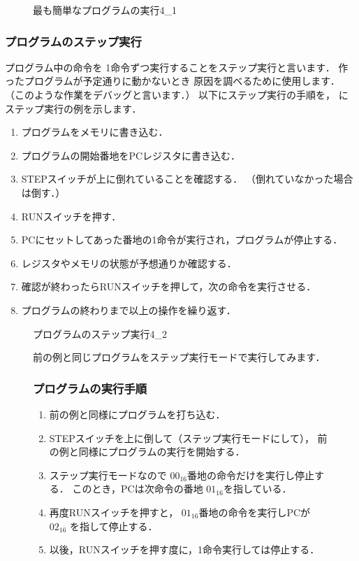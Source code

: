 \begin{figure}[tb]
\begin{rei}{最も簡単なプログラムの実行}{4_1}
  \end{rei}
\end{figure}

\subsubsection{プログラムのステップ実行}
\label{step}
プログラム中の命令を
1命令ずつ実行することをステップ実行と言います．
作ったプログラムが予定通りに動かないとき
原因を調べるために使用します．
（このような作業をデバッグと言います．）
以下にステップ実行の手順を，
にステップ実行の例を示します．

\begin{enumerate}
\item プログラムをメモリに書き込む．
\item プログラムの開始番地をPCレジスタに書き込む．
\item STEPスイッチが上に倒れていることを確認する．
  （倒れていなかった場合は倒す．）
\item RUNスイッチを押す．
\item PCにセットしてあった番地の1命令が実行され，プログラムが停止する．
\item レジスタやメモリの状態が予想通りか確認する．
\item 確認が終わったらRUNスイッチを押して，次の命令を実行させる．
\item プログラムの終わりまで以上の操作を繰り返す．
\end{enumerate}

\begin{figure}[tb]
  \begin{rei}{プログラムのステップ実行}{4_2}

    前の例と同じプログラムをステップ実行モードで実行してみます．

    \subsubsection{プログラムの実行手順}
    \begin{enumerate}
    \item 前の例と同様にプログラムを打ち込む．
    \item STEPスイッチを上に倒して（ステップ実行モードにして），
      前の例と同様にプログラムの実行を開始する．
    \item ステップ実行モードなので
      $00_{16}$番地の命令だけを実行し停止する．
      このとき，PCは次命令の番地 $01_{16}$を指している．
    \item 再度RUNスイッチを押すと，
      $01_{16}$番地の命令を実行しPCが $02_{16}$ を指して停止する．
    \item 以後，RUNスイッチを押す度に，1命令実行しては停止する．
    \end{enumerate}
  \end{rei}
\end{figure}

